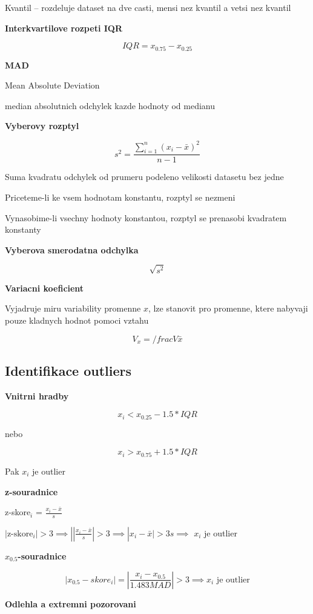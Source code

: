 \documentclass{article}
\begin{document}
Kvantil -- rozdeluje dataset na dve casti, mensi nez kvantil a vetsi nez kvantil

\textbf{Interkvartilove rozpeti IQR}

\[ IQR = x_{0.75} - x_{0.25} \]

\textbf{MAD}

Mean Absolute Deviation

median absolutnich odchylek kazde hodnoty od medianu

\textbf{Vyberovy rozptyl}

\[ s^2 = \frac { \sum_{i=1}^{n} (x_i - \bar{x})^2 } {n-1} \]

Suma kvadratu odchylek od prumeru podeleno velikosti datasetu bez jedne

Priceteme-li ke vsem hodnotam konstantu, rozptyl se nezmeni

Vynasobime-li vsechny hodnoty konstantou, rozptyl se prenasobi kvadratem konstanty

\textbf{Vyberova smerodatna odchylka}

\[ \sqrt{s^2} \]

\textbf{Variacni koeficient}

Vyjadruje miru variability promenne $x$, lze stanovit pro promenne, ktere nabyvaji pouze kladnych hodnot pomoci vztahu

\[ V_x = /frac V {\bar{x}} \]

\subsection{Identifikace outliers}

\textbf{Vnitrni hradby}

\[ x_i < x_{0.25} - 1.5 * IQR \]

nebo

\[ x_i > x_{0.75} + 1.5 * IQR \]

Pak $x_i$ je outlier

\textbf{z-souradnice}

z-skore$_i$ = $ \frac{x_i - \bar{x}} {s} $

$|\text{z-skore$_i$}| > 3 \implies |  \left| \frac{x_i - \bar{x}}{s} \right| > 3 \implies |x_i - \bar{x}| > 3s \implies$ $x_i$ je outlier

\textbf{$x_{0.5}$-souradnice}

\[ |x_{0.5} - skore_i| = \left| \frac{x_i - x_{0.5}}{1.483 MAD} \right| > 3 \implies x_i \text{ je outlier} \]

\textbf{Odlehla a extremni pozorovani}
\end{document}
